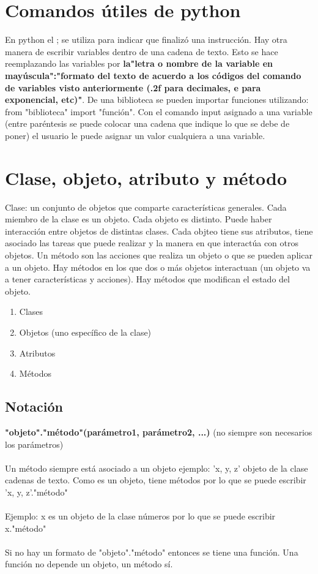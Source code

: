 \documentclass[letterpaper, 12pt, oneside]{article}%
\begin{document}
	\section{Comandos útiles de python}
	En python el ; se utiliza para indicar que finalizó una instrucción. 
	Hay otra manera de escribir variables dentro de una cadena de texto. Esto se hace reemplazando las variables por \textbf{la"letra o nombre de la variable en mayúscula":"formato del texto de acuerdo a los códigos del comando de variables visto anteriormente (.2f para decimales, e para exponencial, etc)"}.
	De una biblioteca se pueden importar funciones utilizando: from "biblioteca" import "función".
	Con el comando input asignado a una variable (entre paréntesis se puede colocar una cadena que indique lo que se debe de poner) el usuario le puede asignar un valor cualquiera a una variable.
	\section{Clase, objeto, atributo y método}
	Clase: un conjunto de objetos que comparte características generales. Cada miembro de la clase es un objeto. Cada objeto es distinto. Puede haber interacción entre objetos de distintas clases. Cada objteo tiene sus atributos, tiene asociado las tareas que puede realizar y la manera en que interactúa con otros objetos. Un método son las acciones que realiza un objeto o que se pueden aplicar a un objeto. Hay métodos en los que dos o más objetos interactuan (un objeto va a tener características y acciones). Hay métodos que modifican el estado del objeto.
	\begin{enumerate} 
	\item{Clases}
	\item{Objetos (uno específico de la clase)}
	\item{Atributos}
	\item{Métodos}
	\end{enumerate}
\subsection*{Notación}
\textbf{"objeto"."método"(parámetro1, parámetro2, ...)}
(no siempre son necesarios los parámetros)
\\\\
	Un método siempre está asociado a un objeto 
	ejemplo:
	'x, y, z' objeto de la clase cadenas de texto. Como es un objeto, tiene métodos por lo que se puede escribir 'x, y, z'."método"
	\\\\
	Ejemplo:
	x es un objeto de la clase números por lo que se puede escribir x."método"
	\\\\
	Si no hay un formato de "objeto"."método" entonces se tiene una función. Una función no depende un objeto, un método sí. 
	
	
\end{document}
